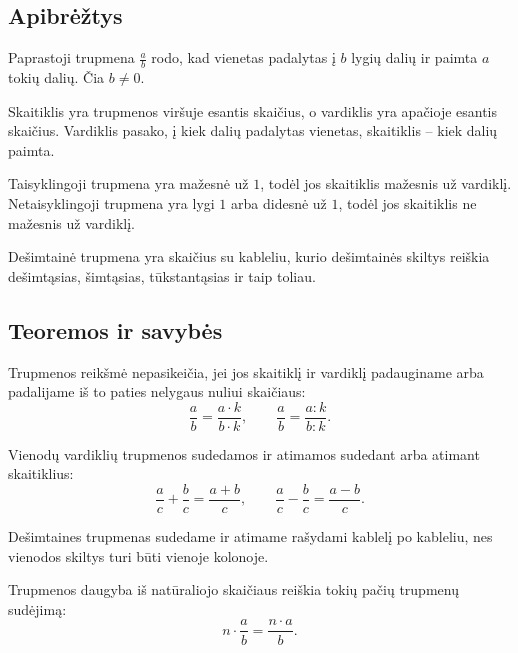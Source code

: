 \subsection{Apibrėžtys}
\begin{apibreztis}
Paprastoji trupmena \(\frac{a}{b}\) rodo, kad vienetas padalytas į \(b\) lygių dalių ir paimta \(a\) tokių dalių. Čia \(b\ne 0\).
\end{apibreztis}
\begin{apibreztis}
Skaitiklis yra trupmenos viršuje esantis skaičius, o vardiklis yra apačioje esantis skaičius. Vardiklis pasako, į kiek dalių padalytas vienetas, skaitiklis -- kiek dalių paimta.
\end{apibreztis}
\begin{apibreztis}
Taisyklingoji trupmena yra mažesnė už \(1\), todėl jos skaitiklis mažesnis už vardiklį. Netaisyklingoji trupmena yra lygi \(1\) arba didesnė už \(1\), todėl jos skaitiklis ne mažesnis už vardiklį.
\end{apibreztis}
\begin{apibreztis}
Dešimtainė trupmena yra skaičius su kableliu, kurio dešimtainės skiltys reiškia dešimtąsias, šimtąsias, tūkstantąsias ir taip toliau.
\end{apibreztis}

\subsection{Teoremos ir savybės}
\begin{savybe}
Trupmenos reikšmė nepasikeičia, jei jos skaitiklį ir vardiklį padauginame arba padalijame iš to paties nelygaus nuliui skaičiaus:
\[
\frac{a}{b}=\frac{a\cdot k}{b\cdot k},\qquad \frac{a}{b}=\frac{a:k}{b:k}.
\]
\end{savybe}
\begin{savybe}
Vienodų vardiklių trupmenos sudedamos ir atimamos sudedant arba atimant skaitiklius:
\[
\frac{a}{c}+\frac{b}{c}=\frac{a+b}{c},\qquad \frac{a}{c}-\frac{b}{c}=\frac{a-b}{c}.
\]
\end{savybe}
\begin{savybe}
Dešimtaines trupmenas sudedame ir atimame rašydami kablelį po kableliu, nes vienodos skiltys turi būti vienoje kolonoje.
\end{savybe}
\begin{savybe}
Trupmenos daugyba iš natūraliojo skaičiaus reiškia tokių pačių trupmenų sudėjimą:
\[
n\cdot \frac{a}{b}=\frac{n\cdot a}{b}.
\]
\end{savybe}

